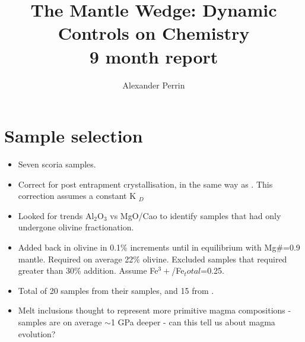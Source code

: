 \documentclass{scrartcl}
\title{The Mantle Wedge: Dynamic Controls on Chemistry\\ 9 month report}
\author{Alexander Perrin}
\begin{document}
\section{Sample selection}
\begin{itemize}
\item Seven scoria samples.
\item Correct for post entrapment crystallisation, in the same way as . This correction assumes a constant K $_{D}$
\item Looked for trends Al$_2$O$_3$ vs MgO/Cao to identify samples that had only undergone olivine fractionation.
\item Added back in olivine in 0.1\% increments until in equilibrium with Mg\#=0.9 mantle. Required on average 22\% olivine. Excluded samples that required greater than 30\% addition. Assume Fe$^3+$/Fe$_total$=0.25.
\item Total of 20 samples from their samples, and 15 from \cite{shaw2008hydrogen}.
\item Melt inclusions thought to represent more primitive magma compositions \cite{schiano2003primitive} - \cite{kelley2010mantle} samples are on average $\sim$1 GPa deeper - can this tell us about magma evolution?
\end{itemize}
\end{document}
